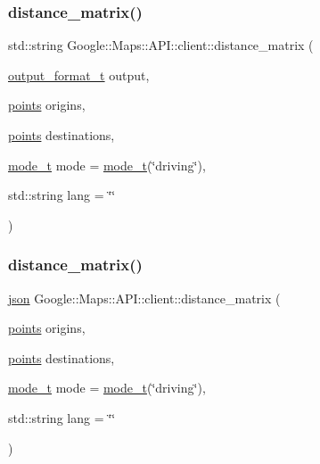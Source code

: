 \subsubsection{\texorpdfstring{distance\+\_\+matrix()}{distance\_matrix()}\hspace{0.1cm}{\footnotesize\ttfamily [1/2]}}
{\footnotesize\ttfamily std\+::string Google\+::\+Maps\+::\+A\+P\+I\+::client\+::distance\+\_\+matrix (\begin{DoxyParamCaption}\item[{\hyperlink{a00055}{output\+\_\+format\+\_\+t}}]{output,  }\item[{\hyperlink{a00063}{points}}]{origins,  }\item[{\hyperlink{a00063}{points}}]{destinations,  }\item[{\hyperlink{a00051}{mode\+\_\+t}}]{mode = {\ttfamily \hyperlink{a00051}{mode\+\_\+t}(\char`\"{}driving\char`\"{})},  }\item[{std\+::string}]{lang = {\ttfamily \char`\"{}\char`\"{}} }\end{DoxyParamCaption})\hspace{0.3cm}{\ttfamily [inline]}}

\mbox{\label{a00047_a8682b0c7b0597c2f7f0585c314459418}} 
\subsubsection{\texorpdfstring{distance\+\_\+matrix()}{distance\_matrix()}\hspace{0.1cm}{\footnotesize\ttfamily [2/2]}}
{\footnotesize\ttfamily \hyperlink{a00011_ab701e3ac61a85b337ec5c1abaad6742d}{json} Google\+::\+Maps\+::\+A\+P\+I\+::client\+::distance\+\_\+matrix (\begin{DoxyParamCaption}\item[{\hyperlink{a00063}{points}}]{origins,  }\item[{\hyperlink{a00063}{points}}]{destinations,  }\item[{\hyperlink{a00051}{mode\+\_\+t}}]{mode = {\ttfamily \hyperlink{a00051}{mode\+\_\+t}(\char`\"{}driving\char`\"{})},  }\item[{std\+::string}]{lang = {\ttfamily \char`\"{}\char`\"{}} }\end{DoxyParamCaption})\hspace{0.3cm}{\ttfamily [inline]}}




